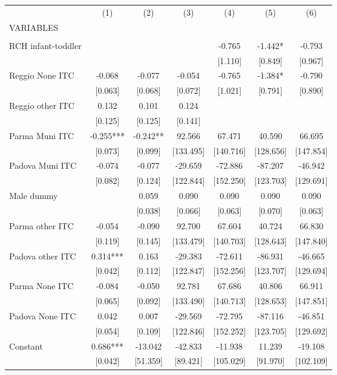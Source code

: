\begin{tabular}{lcccccc} \hline
 & (1) & (2) & (3) & (4) & (5) & (6) \\
VARIABLES &  &  &  &  &  &  \\ \hline
 &  &  &  &  &  &  \\
RCH infant-toddler &  &  &  & -0.765 & -1.442* & -0.793 \\
 &  &  &  & [1.110] & [0.849] & [0.967] \\
Reggio None ITC & -0.068 & -0.077 & -0.054 & -0.765 & -1.384* & -0.790 \\
 & [0.063] & [0.068] & [0.072] & [1.021] & [0.791] & [0.890] \\
Reggio other ITC & 0.132 & 0.101 & 0.124 &  &  &  \\
 & [0.125] & [0.125] & [0.141] &  &  &  \\
Parma Muni ITC & -0.255*** & -0.242** & 92.566 & 67.471 & 40.590 & 66.695 \\
 & [0.073] & [0.099] & [133.495] & [140.716] & [128.656] & [147.854] \\
Padova Muni ITC & -0.074 & -0.077 & -29.659 & -72.886 & -87.207 & -46.942 \\
 & [0.082] & [0.124] & [122.844] & [152.250] & [123.703] & [129.691] \\
Male dummy &  & 0.059 & 0.090 & 0.090 & 0.090 & 0.090 \\
 &  & [0.038] & [0.066] & [0.063] & [0.070] & [0.063] \\
Parma other ITC & -0.054 & -0.090 & 92.700 & 67.604 & 40.724 & 66.830 \\
 & [0.119] & [0.145] & [133.479] & [140.703] & [128.643] & [147.840] \\
Padova other ITC & 0.314*** & 0.163 & -29.383 & -72.611 & -86.931 & -46.665 \\
 & [0.042] & [0.112] & [122.847] & [152.256] & [123.707] & [129.694] \\
Parma None ITC & -0.084 & -0.050 & 92.781 & 67.686 & 40.806 & 66.911 \\
 & [0.065] & [0.092] & [133.490] & [140.713] & [128.653] & [147.851] \\
Padova None ITC & 0.042 & 0.007 & -29.569 & -72.795 & -87.116 & -46.851 \\
 & [0.054] & [0.109] & [122.846] & [152.252] & [123.705] & [129.692] \\
Constant & 0.686*** & -13.042 & -42.833 & -11.938 & 11.239 & -19.108 \\
 & [0.042] & [51.359] & [89.421] & [105.029] & [91.970] & [102.109] \\

\end{tabular}
